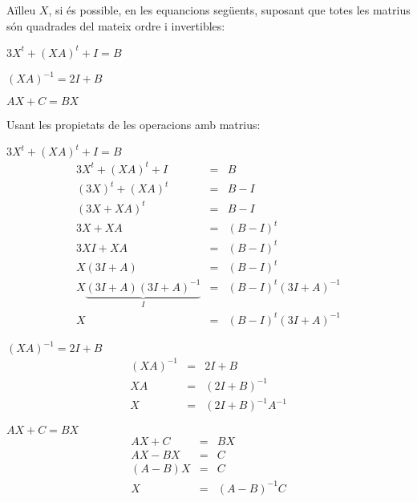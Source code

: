 \Exercise
  Aïlleu $X$, si és possible, en les equancions següents, suposant que totes les matrius són quadrades del mateix ordre i invertibles:
  \begin{llista}[label=(\alph*) ]
    \item $3 X^t+ (XA)^t + I = B$
    \item $(XA)^{-1}=2I+B$
    \item $AX+C=BX$
  \end{llista}

\Answer Usant les propietats de les operacions amb matrius:

  \begin{llista}[label=(\alph*) ]
    \item $3 X^t+ (XA)^t + I = B$
    \begin{eqnarray*}
      3 X^t+ (XA)^t + I &=&B\\
      (3X)^t + (XA)^t &=& B-I\\
      (3X+XA)^t &=& B-I\\
      3X+XA &=& (B-I)^t\\
      3XI+XA &=& (B-I)^t\\
      X(3I+A) &=& (B-I)^t\\
      X\underbrace{(3I+A)(3I+A)^{-1}}_{I} &=& (B-I)^t(3I+A)^{-1}\\
      X &=& (B-I)^t(3I+A)^{-1}
    \end{eqnarray*}
    \blacksquare

    \item $(XA)^{-1}=2I+B$
    \begin{eqnarray*}
      (XA)^{-1}&=&2I+B\\
      XA&=&(2I+B)^{-1}\\
      X&=&(2I+B)^{-1}A^{-1}
    \end{eqnarray*}
    \blacksquare

    \item $AX+C=BX$
    \begin{eqnarray*}
      AX+C&=&BX\\
      AX-BX&=&C\\
      (A-B)X&=&C\\
      X&=&(A-B)^{-1}C
    \end{eqnarray*}
    \blacksquare

  \end{llista}
